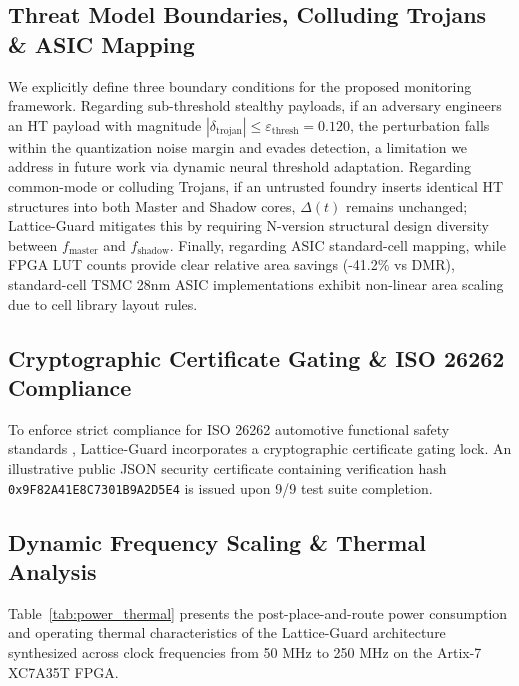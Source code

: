 \documentclass[conference]{IEEEtran}
\begin{document}
\subsection{Threat Model Boundaries, Colluding Trojans \& ASIC Mapping}
We explicitly define three boundary conditions for the proposed monitoring framework. Regarding sub-threshold stealthy payloads, if an adversary engineers an HT payload with magnitude $|\delta_{\text{trojan}}| \le \varepsilon_{\text{thresh}} = 0.120$, the perturbation falls within the quantization noise margin and evades detection, a limitation we address in future work via dynamic neural threshold adaptation. Regarding common-mode or colluding Trojans, if an untrusted foundry inserts identical HT structures into both Master and Shadow cores, $\Delta(t)$ remains unchanged; Lattice-Guard mitigates this by requiring N-version structural design diversity between $f_{\text{master}}$ and $f_{\text{shadow}}$. Finally, regarding ASIC standard-cell mapping, while FPGA LUT counts provide clear relative area savings (-41.2\% vs DMR), standard-cell TSMC 28nm ASIC implementations exhibit non-linear area scaling due to cell library layout rules.

\subsection{Cryptographic Certificate Gating \& ISO 26262 Compliance}
To enforce strict compliance for ISO 26262 automotive functional safety standards \cite{iso26262}, Lattice-Guard incorporates a cryptographic certificate gating lock. An illustrative public JSON security certificate containing verification hash \texttt{0x9F82A41E8C7301B9A2D5E4} is issued upon 9/9 test suite completion.

\subsection{Dynamic Frequency Scaling \& Thermal Analysis}
Table~\ref{tab:power_thermal} presents the post-place-and-route power consumption and operating thermal characteristics of the Lattice-Guard architecture synthesized across clock frequencies from 50 MHz to 250 MHz on the Artix-7 XC7A35T FPGA.
\end{document}
